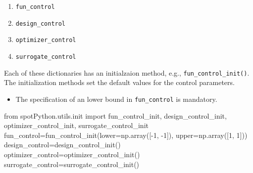 \documentclass[
  letterpaper,
  DIV=11,
  numbers=noendperiod]{scrreprt}
\newenvironment{Shaded}{\begin{snugshade}}{\end{snugshade}}
\newcommand{\DecValTok}[1]{\textcolor[rgb]{0.68,0.00,0.00}{#1}}
\newcommand{\ImportTok}[1]{\textcolor[rgb]{0.00,0.46,0.62}{#1}}
\newcommand{\NormalTok}[1]{\textcolor[rgb]{0.00,0.23,0.31}{#1}}
\newcommand{\OperatorTok}[1]{\textcolor[rgb]{0.37,0.37,0.37}{#1}}
\providecommand{\tightlist}{%
  \setlength{\itemsep}{0pt}\setlength{\parskip}{0pt}}\usepackage{longtable,booktabs,array}
\begin{document}
\begin{enumerate}
\def\labelenumi{\arabic{enumi}.}
\tightlist
\item
  \texttt{fun\_control}
\item
  \texttt{design\_control}
\item
  \texttt{optimizer\_control}
\item
  \texttt{surrogate\_control}
\end{enumerate}

Each of these dictionaries has an initialzaion method, e.g.,
\texttt{fun\_control\_init()}. The initialization methods set the
default values for the control parameters.

\begin{tcolorbox}[enhanced jigsaw, coltitle=black, bottomrule=.15mm, breakable, toprule=.15mm, colframe=quarto-callout-important-color-frame, title=\textcolor{quarto-callout-important-color}{\faExclamation}\hspace{0.5em}{Important:}, colbacktitle=quarto-callout-important-color!10!white, opacityback=0, left=2mm, leftrule=.75mm, colback=white, rightrule=.15mm, bottomtitle=1mm, toptitle=1mm, titlerule=0mm, arc=.35mm, opacitybacktitle=0.6]

\begin{itemize}
\tightlist
\item
  The specification of an lower bound in \texttt{fun\_control} is
  mandatory.
\end{itemize}

\end{tcolorbox}

\begin{Shaded}
\begin{Highlighting}[]
\ImportTok{from}\NormalTok{ spotPython.utils.init }\ImportTok{import}\NormalTok{ fun\_control\_init, design\_control\_init, optimizer\_control\_init, surrogate\_control\_init}
\NormalTok{fun\_control}\OperatorTok{=}\NormalTok{fun\_control\_init(lower}\OperatorTok{=}\NormalTok{np.array([}\OperatorTok{{-}}\DecValTok{1}\NormalTok{, }\OperatorTok{{-}}\DecValTok{1}\NormalTok{]),}
\NormalTok{                            upper}\OperatorTok{=}\NormalTok{np.array([}\DecValTok{1}\NormalTok{, }\DecValTok{1}\NormalTok{]))}
\NormalTok{design\_control}\OperatorTok{=}\NormalTok{design\_control\_init()}
\NormalTok{optimizer\_control}\OperatorTok{=}\NormalTok{optimizer\_control\_init()}
\NormalTok{surrogate\_control}\OperatorTok{=}\NormalTok{surrogate\_control\_init()}
\end{Highlighting}
\end{Shaded}
\end{document}
